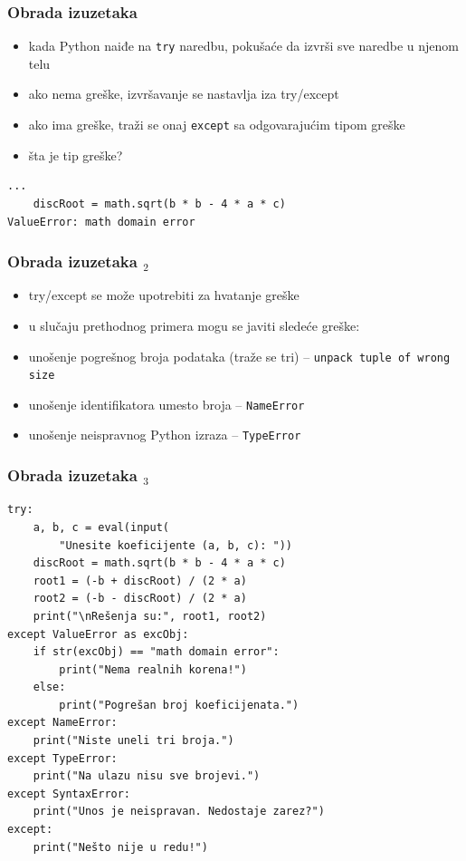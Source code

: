 \documentclass[utf8,compress,aspectratio=169]{beamer}
\begin{document}
\begin{frame}[fragile]
  \frametitle{Obrada izuzetaka}
  \begin{itemize}
    \item kada Python naiđe na \texttt{try} naredbu, pokušaće da izvrši sve naredbe u njenom telu
    \item ako nema greške, izvršavanje se nastavlja iza try/except
    \item ako ima greške, traži se onaj \texttt{except} sa odgovarajućim tipom greške
    \item šta je tip greške?
  \end{itemize}
\begin{verbatim}
...
    discRoot = math.sqrt(b * b - 4 * a * c)
ValueError: math domain error
\end{verbatim}
\end{frame}

\begin{frame}[fragile]
  \frametitle{Obrada izuzetaka $_2$}
  \begin{itemize}
    \item try/except se može upotrebiti za hvatanje  greške
    \item u slučaju prethodnog primera mogu se javiti sledeće greške:
    \item unošenje pogrešnog broja podataka (traže se tri) -- \texttt{unpack tuple of wrong size}
    \item unošenje identifikatora umesto broja -- \texttt{NameError}
    \item unošenje neispravnog Python izraza -- \texttt{TypeError}
  \end{itemize}
\end{frame}

\begin{frame}[fragile,shrink=10]
  \frametitle{Obrada izuzetaka $_3$}
\begin{verbatim}
try:
    a, b, c = eval(input(
        "Unesite koeficijente (a, b, c): "))
    discRoot = math.sqrt(b * b - 4 * a * c)
    root1 = (-b + discRoot) / (2 * a)
    root2 = (-b - discRoot) / (2 * a)
    print("\nRešenja su:", root1, root2)
except ValueError as excObj:
    if str(excObj) == "math domain error":
        print("Nema realnih korena!")
    else:
        print("Pogrešan broj koeficijenata.")
except NameError:
    print("Niste uneli tri broja.")
except TypeError:
    print("Na ulazu nisu sve brojevi.")
except SyntaxError:
    print("Unos je neispravan. Nedostaje zarez?")
except:
    print("Nešto nije u redu!")
\end{verbatim}
\end{frame}
\end{document}
